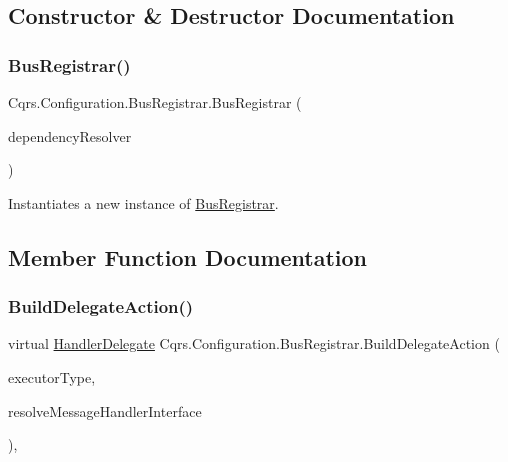 \subsection{Constructor \& Destructor Documentation}
\mbox{\label{classCqrs_1_1Configuration_1_1BusRegistrar_a4a934d21a535b28af6c67154512bba20_a4a934d21a535b28af6c67154512bba20}} 
\subsubsection{\texorpdfstring{Bus\+Registrar()}{BusRegistrar()}}
{\footnotesize\ttfamily Cqrs.\+Configuration.\+Bus\+Registrar.\+Bus\+Registrar (\begin{DoxyParamCaption}\item[{\hyperlink{interfaceCqrs_1_1Configuration_1_1IDependencyResolver}{I\+Dependency\+Resolver}}]{dependency\+Resolver }\end{DoxyParamCaption})}



Instantiates a new instance of \hyperlink{classCqrs_1_1Configuration_1_1BusRegistrar}{Bus\+Registrar}. 



\subsection{Member Function Documentation}
\mbox{\label{classCqrs_1_1Configuration_1_1BusRegistrar_a07d27088739f2ae0ac7c551fc6a72ac9_a07d27088739f2ae0ac7c551fc6a72ac9}} 
\subsubsection{\texorpdfstring{Build\+Delegate\+Action()}{BuildDelegateAction()}}
{\footnotesize\ttfamily virtual \hyperlink{classCqrs_1_1Configuration_1_1HandlerDelegate}{Handler\+Delegate} Cqrs.\+Configuration.\+Bus\+Registrar.\+Build\+Delegate\+Action (\begin{DoxyParamCaption}\item[{Type}]{executor\+Type,  }\item[{Func$<$ Type, I\+Enumerable$<$ Type $>$$>$}]{resolve\+Message\+Handler\+Interface }\end{DoxyParamCaption})\hspace{0.3cm}{\ttfamily [protected]}, {\ttfamily [virtual]}}



